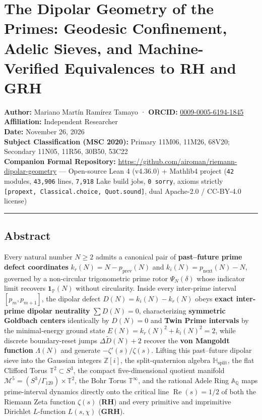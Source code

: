 \documentclass[
  11pt,
]{article}
\author{}
\date{}
\begin{document}
\section{The Dipolar Geometry of the Primes: Geodesic Confinement,
Adelic Sieves, and Machine-Verified Equivalences to RH and
GRH}\label{the-dipolar-geometry-of-the-primes-geodesic-confinement-adelic-sieves-and-machine-verified-equivalences-to-rh-and-grh}

\textbf{Author:} Mariano Martín Ramírez Tamayo · \textbf{ORCID:}
\href{https://orcid.org/0009-0005-6194-1845}{0009-0005-6194-1845}\\
\textbf{Affiliation:} Independent Researcher\\
\textbf{Date:} November 26, 2026\\
\textbf{Subject Classification (MSC 2020):} Primary 11M06, 11M26, 68V20;
Secondary 11N05, 11R56, 30B50, 53C22\\
\textbf{Companion Formal Repository:}
\url{https://github.com/airoman/riemann-dipolar-geometry} ---
Open-source Lean 4 (v4.36.0) + Mathlib4 project (\texttt{42} modules,
\texttt{43,906} lines, \texttt{7,918} Lake build jobs,
\texttt{0\ sorry}, axioms strictly
\texttt{{[}propext,\ Classical.choice,\ Quot.sound{]}}, dual Apache-2.0
/ CC-BY-4.0 license)

\begin{center}\rule{0.5\linewidth}{0.5pt}\end{center}

\subsection{Abstract}\label{abstract}

Every natural number \(N \ge 2\) admits a canonical pair of
\textbf{past--future prime defect coordinates}
\(k_r(N) = N - p_{\text{prev}}(N)\) and
\(k_i(N) = p_{\text{next}}(N) - N\), governed by a non-circular
trigonometric prime rotor \(\Psi_N(\delta)\) whose indicator limit
recovers \(\mathbf{1}_{\mathbb{P}}(N)\) without circularity. Inside
every inter-prime interval \([p_m, p_{m+1}]\), the dipolar defect
\(D(N) = k_i(N) - k_r(N)\) obeys \textbf{exact inter-prime dipolar
neutrality} \(\sum D(N) = 0\), characterizing \textbf{symmetric Goldbach
centers} identically by \(D(N) = 0\) and \textbf{Twin Prime intervals}
by the minimal-energy ground state \(E(N) = k_r(N)^2 + k_i(N)^2 = 2\),
while discrete boundary-reset jumps \(\Delta\widetilde{D}(N) + 2\)
recover the \textbf{von Mangoldt function} \(\Lambda(N)\) and generate
\(-\zeta'(s)/\zeta(s)\). Lifting this past--future dipolar sieve into
the Gaussian integers \(\mathbb{Z}[i]\), the split-quaternion algebra
\(\mathbb{H}_{\text{split}}\), the flat Clifford Torus
\(\mathbb{T}^2 \subset S^3\), the compact five-dimensional quotient
manifold \(\mathcal{M}^5 = (S^3/\Gamma_{120}) \times \mathbb{T}^2\), the
Bohr Torus \(\mathbb{T}^\infty\), and the rational Adele Ring
\(\mathbb{A}_{\mathbb{Q}}\) maps prime-interval dynamics directly onto
the critical line \(\operatorname{Re}(s) = 1/2\) of both the Riemann
Zeta function \(\zeta(s)\) (\textbf{RH}) and every primitive and
imprimitive Dirichlet \(L\)-function \(L(s, \chi)\) (\textbf{GRH}).
\end{document}
